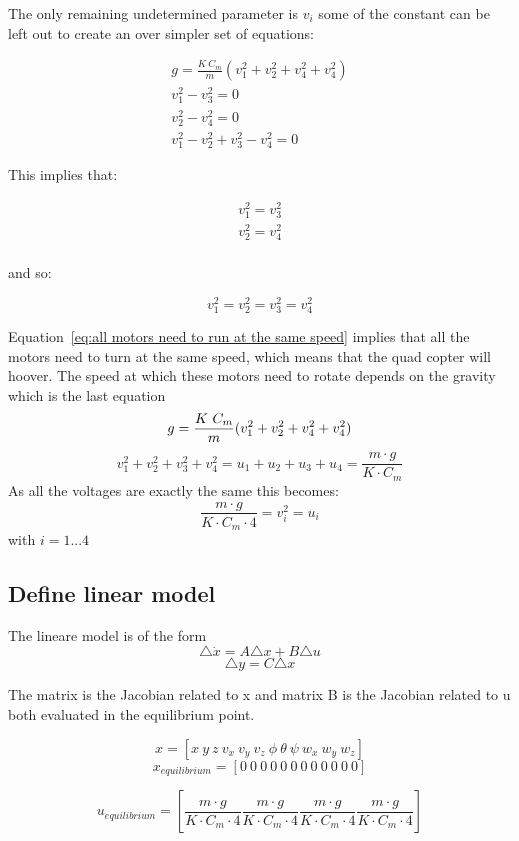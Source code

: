 The only remaining undetermined parameter is $v_i$ some of the constant can be left out to create an over simpler set of equations: 

\begin{eqnarray}
g =  \frac{K \ C_m}{m}(v_1^2+v_2^2+v_4^2+v_4^2)\\
v_1^2 - v_3^2 =0 \\
v_2^2 - v_4^2 =0\\
v_1^2-v_2^2+v_3^2-v_4^2 =0
\end{eqnarray}

This implies that:

\begin{eqnarray}
v_1^2 = v_3^2 \\
v_2^2 = v_4^2 \\
\end{eqnarray}

and so:

\begin{equation}
v_1^2=v_2^2=v_3^2=v_4^2
\label{eq:all motors need to run at the same speed}
\end{equation}

Equation~\ref{eq:all motors need to run at the same speed} implies that all the motors need to turn at the same speed, which means that the quad copter will hoover. The speed at which these motors need to rotate depends on the gravity which is the last equation $$g =  \frac{K \ C_m}{m}(v_1^2+v_2^2+v_4^2+v_4^2) \\$$ $$v_1^2+v_2^2+v_3^2+v_4^2=u_1+u_2+u_3+u_4=\frac{m \cdot g}{K \cdot C_m}$$ As all the voltages are exactly the same this becomes: $$\frac{m \cdot g}{K \cdot C_m \cdot 4}=   v_i^2 = u_i $$ with $i=1...4$ 

\subsection{Define linear model}

The lineare model is of the form $$\triangle \dot{x}=A\triangle x + B\triangle u $$ $$ \triangle y=C\triangle x$$

The matrix is the Jacobian related to x and matrix B is the Jacobian related to u both evaluated in the equilibrium point.

$$x=[x \ y \ z \ v_x \ v_y \ v_z \ \phi \ \theta \ \psi \ w_x \ w_y \ w_z]  $$
$$x_{equilibrium} = [0\ 0\ 0\ 0\ 0\ 0\ 0\ 0\ 0\ 0\ 0\ 0]$$

$$
u_{equilibrium} =
 [\frac{m \cdot g}{K \cdot C_m \cdot 4} \frac{m \cdot g}{K \cdot C_m \cdot 4} \frac{m \cdot g}{K \cdot C_m \cdot 4} \frac{m \cdot g}{K \cdot C_m \cdot 4}] 
$$

